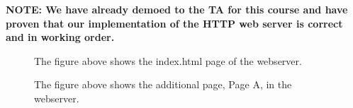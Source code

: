 \textbf{NOTE: We have already demoed to the TA for this course and have proven that our implementation of the HTTP web server is correct and in working order.}
     \begin{figure}[!htbp]
        \caption{The figure above shows the index.html page of the webserver.}
    \end{figure}
         \begin{figure}[!htbp]
  \caption{The figure above shows the additional page, Page A, in the webserver.}
\end{figure}
